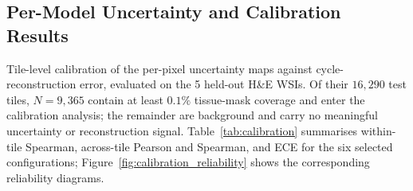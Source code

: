 \subsection{Per-Model Uncertainty and Calibration Results}
\label{sec:supp-unc-results}

Tile-level calibration of the per-pixel uncertainty maps against cycle-reconstruction
error, evaluated on the 5 held-out H\&E WSIs. Of their $16{,}290$ test tiles,
$N{=}9{,}365$ contain at least $0.1\%$ tissue-mask coverage and enter the
calibration analysis; the remainder are background and carry no meaningful
uncertainty or reconstruction signal.
Table~\ref{tab:calibration} summarises within-tile Spearman, across-tile Pearson and
Spearman, and ECE for the six selected configurations;
Figure~\ref{fig:calibration_reliability} shows the corresponding reliability diagrams.

\begin{table}[h!]
\centering
\caption{Uncertainty calibration results. Within-tile $r_s$: mean~$\pm$~std of
  per-tile Spearman rank correlation between pixel-level uncertainty $U$ and
  cycle-reconstruction error $E$ over tissue pixels.
  Across-tile Pearson and Spearman: correlations between tile-mean $\overline{U}$
  and tile-mean $\overline{E}$.
  ECE: tile-level expected calibration error after joint $p_1$--$p_{99}$ normalisation.
  $\uparrow$ = higher is better; $\downarrow$ = lower is better.
  All results on $N{=}9{,}365$ tiles from the 5 held-out H\&E WSIs.}
\label{tab:calibration}
\end{table}

